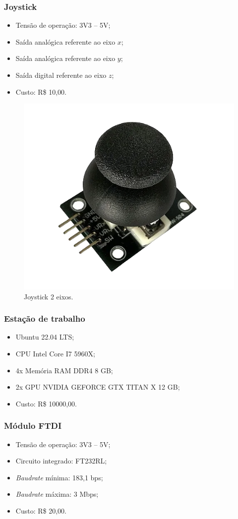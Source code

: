 \subsubsection*{Joystick}
	
	\begin{itemize}
		\item Tensão de operação: 3V3 -- 5V;
		\item Saída analógica referente ao eixo $x$;
		\item Saída analógica referente ao eixo $y$;
		\item Saída digital referente ao eixo $z$;
		\item Custo: R\$ 10,00.
	\end{itemize}



\begin{figure}[!h]
\centering
\includegraphics[width=0.3\linewidth]{img/joystick}
\caption{Joystick 2 eixos.}
\label{fig:joystick}
\end{figure}

\subsubsection*{Estação de trabalho}

\begin{itemize}
	\item Ubuntu 22.04 LTS;
	\item CPU Intel Core I7 5960X;
	\item 4x Memória RAM DDR4 8 GB;
	\item 2x GPU NVIDIA GEFORCE GTX TITAN X 12 GB;
	\item Custo: R\$ 10000,00.
\end{itemize}

\subsubsection*{Módulo FTDI}

\begin{itemize}
	\item Tensão de operação: 3V3 -- 5V;
	\item Circuito integrado: FT232RL;
	\item \textit{Baudrate} mínima: 183,1 bps;
	\item \textit{Baudrate} máxima: 3 Mbps;
	\item Custo: R\$ 20,00.
\end{itemize}

